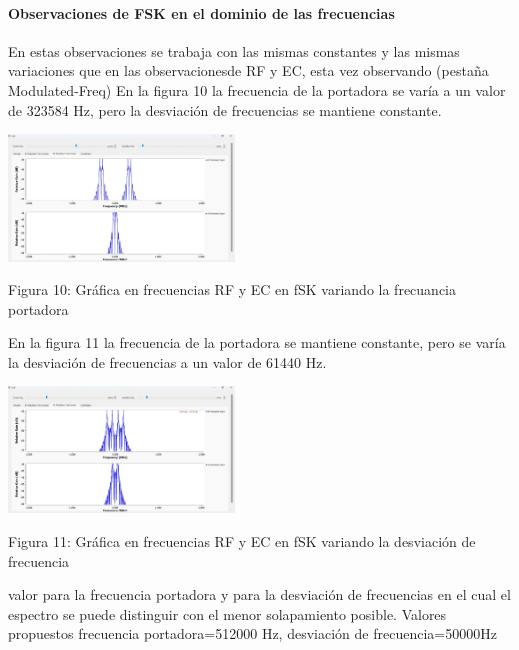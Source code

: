 \documentclass{journal}[IEEEtran, twocolumn]             %
\begin{document}
\begin{multicols}{2}
{\paragraph{Observaciones de FSK en el dominio de las frecuencias}
En estas observaciones se trabaja con las mismas constantes y las mismas variaciones que en las observacionesde RF y EC, esta vez observando (pestaña Modulated-Freq)
En la figura 10 la frecuencia de la portadora se varía a un valor de 323584 Hz, pero la desviación de frecuencias se mantiene constante.
 \begin{center}
        \includegraphics[width=0.45\textwidth]{figs/F10.png}
        \caption{Figura 10: Gráfica en frecuencias RF y EC en fSK variando la frecuancia portadora}
        \label{fig:10}
    \end{center}
 En la figura 11 la frecuencia de la portadora se mantiene constante, pero se varía la desviación de frecuencias a un valor de 61440 Hz.
 \begin{center}
        \includegraphics[width=0.45\textwidth]{figs/F11.png}
        \caption{Figura 11: Gráfica en frecuencias RF y EC en fSK variando la desviación de frecuencia}
        \label{fig:11}
    \end{center}
valor para la frecuencia portadora y para la desviación de 
frecuencias en el cual el espectro se puede distinguir con el menor solapamiento posible. 
Valores propuestos frecuencia portadora=512000 Hz, desviación de frecuencia=50000Hz

}
\end{multicols}
\end{document}
